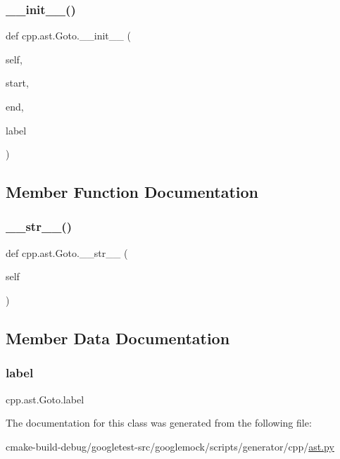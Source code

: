 \subsubsection{\texorpdfstring{\_\_init\_\_()}{\_\_init\_\_()}}
{\footnotesize\ttfamily def cpp.\+ast.\+Goto.\+\_\+\+\_\+init\+\_\+\+\_\+ (\begin{DoxyParamCaption}\item[{}]{self,  }\item[{}]{start,  }\item[{}]{end,  }\item[{}]{label }\end{DoxyParamCaption})}



\subsection{Member Function Documentation}
\mbox{\label{classcpp_1_1ast_1_1Goto_a508b6bc091cf06bfed73a33368c236c9}} 
\subsubsection{\texorpdfstring{\_\_str\_\_()}{\_\_str\_\_()}}
{\footnotesize\ttfamily def cpp.\+ast.\+Goto.\+\_\+\+\_\+str\+\_\+\+\_\+ (\begin{DoxyParamCaption}\item[{}]{self }\end{DoxyParamCaption})}



\subsection{Member Data Documentation}
\mbox{\label{classcpp_1_1ast_1_1Goto_a685284ea5f3b21f39aff7f5db841c8f5}} 
\subsubsection{\texorpdfstring{label}{label}}
{\footnotesize\ttfamily cpp.\+ast.\+Goto.\+label}



The documentation for this class was generated from the following file\+:\begin{DoxyCompactItemize}
\item 
cmake-\/build-\/debug/googletest-\/src/googlemock/scripts/generator/cpp/\mbox{\hyperlink{ast_8py}{ast.\+py}}\end{DoxyCompactItemize}
